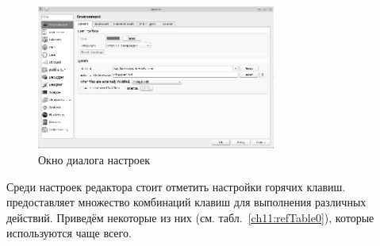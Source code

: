 \begin{figure}[htb]
\begin{center}
\includegraphics[width=0.7\textwidth]{img/ris_11_2}
\caption[Окно диалога настроек ]{Окно диалога настроек }
\label{ch11:refDrawing1}
\end{center}
\end{figure}

Среди настроек редактора стоит отметить настройки горячих клавиш. 
 предоставляет множество комбинаций клавиш для выполнения различных действий. 
Приведём некоторые из них (см. табл.~\ref{ch11:refTable0}), которые
используются чаще всего.

